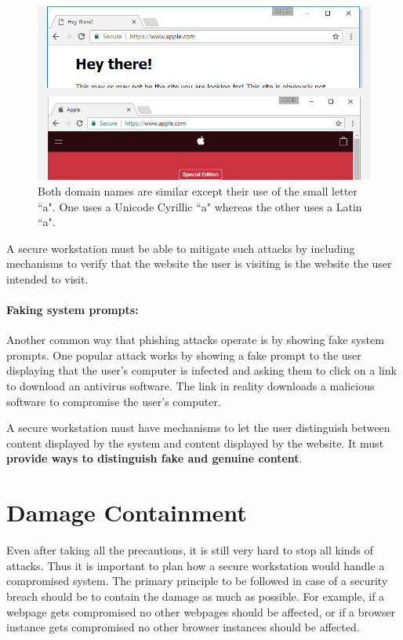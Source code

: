 \begin{figure}[p]
\centering
    \includegraphics[width=1.0\textwidth]{punycode-apple}
    \caption{Both domain names are similar except their use of the small letter ``a". One uses a Unicode Cyrillic ``a" whereas the other uses a Latin ``a".}
   \label{fig:punycode-apple}
\end{figure}

A secure workstation must be able to mitigate such attacks by including mechanisms to verify that the website the user is visiting is the website the user intended to visit.

\paragraph{Faking system prompts:} Another common way that phishing attacks operate is by showing fake system prompts. One popular attack works by showing a fake prompt to the user displaying that the user's computer is infected and asking them to click on a link to download an antivirus software. The link in reality downloads a malicious software to compromise the user's computer.

A secure workstation must have mechanisms to let the user distinguish between content displayed by the system and content displayed by the website. It must \textbf{provide ways to distinguish fake and genuine content}.

\section{Damage Containment}

Even after taking all the precautions, it is still very hard to stop all kinds of attacks. Thus it is important to plan how a secure workstation would handle a compromised system. The primary principle to be followed in case of a security breach should be to contain the damage as much as possible. For example, if a webpage gets compromised no other webpages should be affected, or if a browser instance gets compromised no other browser instances should be affected.


